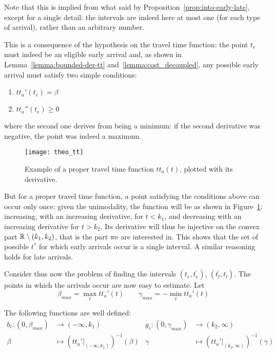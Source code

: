 Note that this is implied from what said by Proposition~\ref{prop:into-early-late},
except for a single detail:
the intervals are indeed here at most one (for each type of arrival), rather than an arbitrary number.

This is a consequence of the hypothesis on the travel time function:
the point \(t_e\) must indeed be an eligible early arrival and,
as shown in Lemma~\ref{lemma:bounded-der-tt} and~\ref{lemma:cost_decoupled},
any possible early arrival must satisfy two simple conditions:
\begin{enumerate}
\item \(tt_a'(t_e) = \beta\)
\item \(tt_a''(t_e) \geq 0\)
\end{enumerate}
where the second one derives from being a minimum:
if the second derivative was negative, the point was indeed a maximum.

\begin{figure}
  \centering
  \texttt{[image: theo\_tt]}
  \caption{
    Example of a proper travel time function \(tt_a(t)\),
  plotted with its derivative.}
  \label{fig:theo_tt}
\end{figure}

But for a proper travel time function,
a point satisfying the conditions above can occur only once:
given the unimodality,
the function will be as shown in Figure~\ref{fig:theo_tt}: increasing, with an increasing derivative,
for \(t < k_1\), and decreasing with an increasing derivative for \(t > k_2\).
Its derivative will thus be injective on the convex part \(\mathbb{R} \setminus (k_1, k_2)\),
that is the part we are interested in.
This shows that the set of possible \(t^*\) for which early arrivals occur is a single interval.
A similar reasoning holds for late arrivals.

Consider thus now the problem of finding the intervals \((t_e, \bar{t_e})\), \((\bar{t_l}, t_l)\).
The points in which the arrivals occur are now easy to estimate. Let
\begin{equation*}
  \beta_{max} = \max_t tt_a'(t)\qquad \gamma_{max} = -\min_t tt_a'(t)
\end{equation*}

The following functions are well defined:
\begin{align*}
  b_i: (0, \beta_{max}) & \rightarrow (-\infty, k_1)  & g_e: (0, \gamma_{max}) & \rightarrow (k_2, \infty) \\
       \beta & \mapsto (tt_a' |_{(-\infty, k_1)})^{-1}(\beta) & \gamma & \mapsto(tt_a' |_{(k_2, \infty)})^{-1}(\gamma)
\end{align*}

